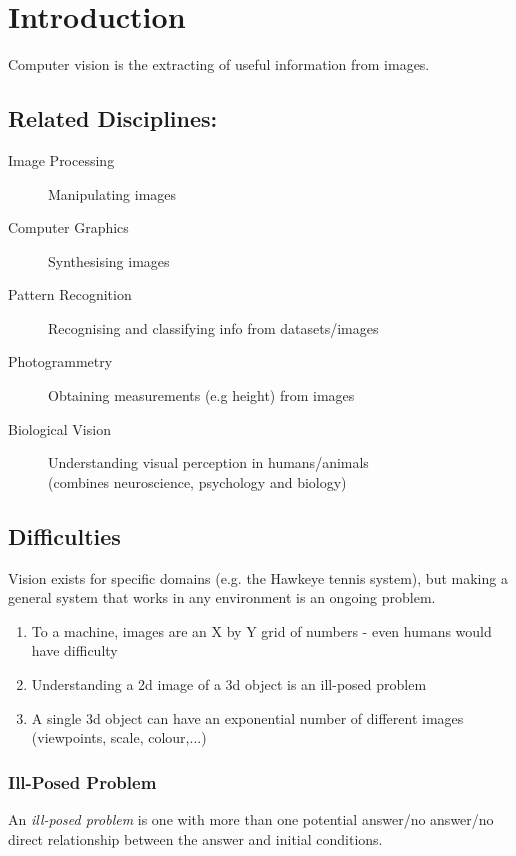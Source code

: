 \section{Introduction}

Computer vision is the extracting of useful information from images. 

\subsection{Related Disciplines:}
\begin{description}
    \item[Image Processing] Manipulating images
    \item[Computer Graphics] Synthesising images
    \item[Pattern Recognition] Recognising and classifying info from datasets/images
    \item[Photogrammetry] Obtaining measurements (e.g height) from images
    \item[Biological Vision] Understanding visual perception in humans/animals \\ \quad \quad  (combines neuroscience, psychology and biology)
\end{description}

\subsection{Difficulties}
Vision exists for specific domains (e.g. the Hawkeye tennis system), but making a general system that works in any environment is an ongoing problem.  

\begin{enumerate}
    \item To a machine, images are an X by Y grid of numbers - even humans would have difficulty
    \item Understanding a 2d image of a 3d object is an ill-posed problem
    \item A single 3d object can have an exponential number of different images (viewpoints, scale, colour,...)
\end{enumerate}

\subsubsection{Ill-Posed Problem}
An \emph{ill-posed problem} is one with more than one potential answer/no answer/no direct relationship between the answer and initial conditions. \\

